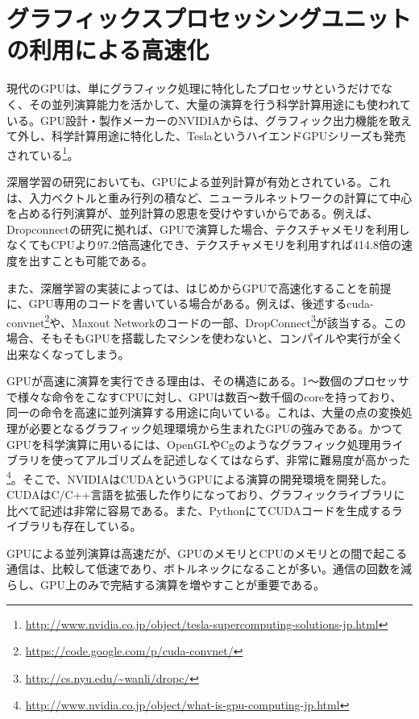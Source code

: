\section{グラフィックスプロセッシングユニットの利用による高速化}
現代のGPUは、単にグラフィック処理に特化したプロセッサというだけでなく、その並列演算能力を活かして、大量の演算を行う科学計算用途にも使われている。GPU設計・製作メーカーのNVIDIAからは、グラフィック出力機能を敢えて外し、科学計算用途に特化した、TeslaというハイエンドGPUシリーズも発売されている\footnote{\url{http://www.nvidia.co.jp/object/tesla-supercomputing-solutions-jp.html}}。\par 
深層学習の研究においても、GPUによる並列計算が有効とされている。これは、入力ベクトルと重み行列の積など、ニューラルネットワークの計算にて中心を占める行列演算が、並列計算の恩恵を受けやすいからである\cite{bengio2012practical}。例えば、Dropconnectの研究に拠れば、GPUで演算した場合、テクスチャメモリを利用しなくてもCPUより97.2倍高速化でき、テクスチャメモリを利用すれば414.8倍の速度を出すことも可能である\cite{wan2013regularization}。\par
また、深層学習の実装によっては、はじめからGPUで高速化することを前提に、GPU専用のコードを書いている場合がある。例えば、後述するcuda-convnet\footnote{\url{https://code.google.com/p/cuda-convnet/}}や、Maxout Network\cite{goodfellow2013maxout}のコードの一部、DropConnect\cite{wan2013regularization}\footnote{\url{http://cs.nyu.edu/~wanli/dropc/}}が該当する。この場合、そもそもGPUを搭載したマシンを使わないと、コンパイルや実行が全く出来なくなってしまう。\par
GPUが高速に演算を実行できる理由は、その構造にある。1〜数個のプロセッサで様々な命令をこなすCPUに対し、GPUは数百〜数千個のcoreを持っており、同一の命令を高速に並列演算する用途に向いている。これは、大量の点の変換処理が必要となるグラフィック処理環境から生まれたGPUの強みである。かつてGPUを科学演算に用いるには、OpenGLやCgのようなグラフィック処理用ライブラリを使ってアルゴリズムを記述しなくてはならず、非常に難易度が高かった\footnote{\url{http://www.nvidia.co.jp/object/what-is-gpu-computing-jp.html}}。そこで、NVIDIAはCUDAというGPUによる演算の開発環境を開発した\cite{garland2008parallel}。CUDAはC/C++言語を拡張した作りになっており、グラフィックライブラリに比べて記述は非常に容易である。また、PythonにてCUDAコードを生成するライブラリも存在している\cite{klockner2009pycuda:}\cite{klockner2012pycuda}。\par
GPUによる並列演算は高速だが、GPUのメモリとCPUのメモリとの間で起こる通信は、比較して低速であり、ボトルネックになることが多い。通信の回数を減らし、GPU上のみで完結する演算を増やすことが重要である\cite{bengio2012practical}。



